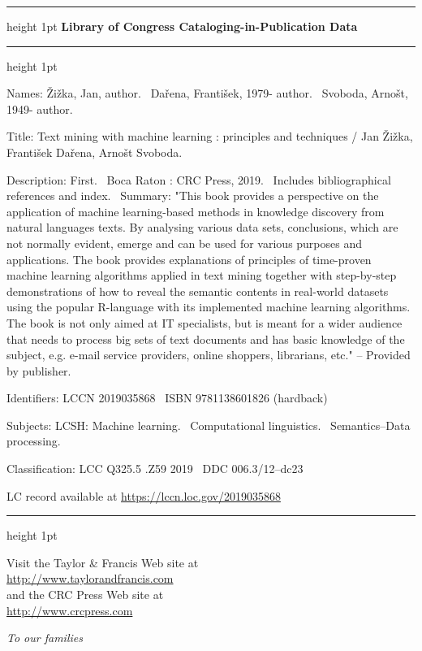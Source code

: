 \documentclass[11pt,openany,executivepaper]{book}
\begin{document}
\begin{center}
  \raggedbottom
  \begin{minipage}{0.85\textwidth}
    
    \small
    \hrule height 1pt
    \vspace{8pt}
    \centering\bfseries Library of Congress Cataloging-in-Publication Data
    \vspace{8pt}
    \hrule height 1pt
    \vspace{10pt}
    \raggedright\tiny
    Names: Žižka, Jan, author. \textbar\ Dařena, František, 1979- author. \textbar\ Svoboda, Arnošt, 1949- author.

    Title: Text mining with machine learning : principles and techniques / Jan Žižka, František Dařena, Arnošt Svoboda.

    Description: First. \textbar\ Boca Raton : CRC Press, 2019. \textbar\ Includes bibliographical references and index. \textbar\ Summary: "This book provides a perspective on the application of machine learning-based methods in knowledge discovery from natural languages texts. By analysing various data sets, conclusions, which are not normally evident, emerge and can be used for various purposes and applications. The book provides explanations of principles of time-proven machine learning algorithms applied in text mining together with step-by-step demonstrations of how to reveal the semantic contents in real-world datasets using the popular R-language with its implemented machine learning algorithms. The book is not only aimed at IT specialists, but is meant for a wider audience that needs to process big sets of text documents and has basic knowledge of the subject, e.g. e-mail service providers, online shoppers, librarians, etc." -- Provided by publisher.
    
    Identifiers: LCCN 2019035868 \textbar\ ISBN 9781138601826 (hardback)

    Subjects: LCSH: Machine learning. \textbar\ Computational linguistics. \textbar\ Semantics--Data processing.

    Classification: LCC Q325.5 .Z59 2019 \textbar\ DDC 006.3/12--dc23

    LC record available at \url{https://lccn.loc.gov/2019035868}
    \vspace{10pt}
    \hrule height 1pt
  \end{minipage}
\end{center}
\begin{sloppypar}
\raggedright
Visit the Taylor \& Francis Web site at\\
\url{http://www.taylorandfrancis.com}\\
and the CRC Press Web site at\\
\url{http://www.crcpress.com}\\

\end{sloppypar}
\clearpage
\vspace*{\fill}
\begin{center}
  \Huge\itshape To our families
\end{center}
\vspace*{\fill}
\cleardoublepage
{}
\tableofcontents

\cleardoublepage
{}
{}
\end{document}

